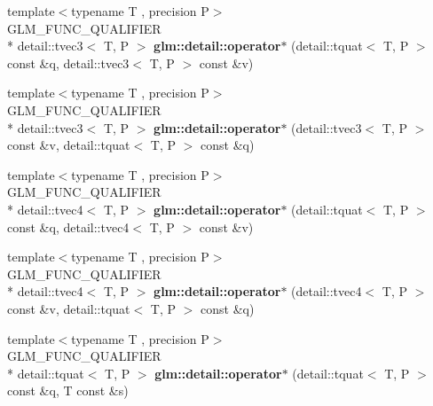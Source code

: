 \begin{DoxyCompactItemize}
\item 
\hypertarget{namespaceglm_1_1detail_a217e4015819bcaf1cc8f30c99698b102}{{\footnotesize template$<$typename T , precision P$>$ }\\G\-L\-M\-\_\-\-F\-U\-N\-C\-\_\-\-Q\-U\-A\-L\-I\-F\-I\-E\-R \\*
detail\-::tvec3$<$ T, P $>$ {\bfseries glm\-::detail\-::operator$\ast$} (detail\-::tquat$<$ T, P $>$ const \&q, detail\-::tvec3$<$ T, P $>$ const \&v)}\label{namespaceglm_1_1detail_a217e4015819bcaf1cc8f30c99698b102}

\item 
\hypertarget{namespaceglm_1_1detail_a1e3484b9cf1adf99d5cdefa17192960f}{{\footnotesize template$<$typename T , precision P$>$ }\\G\-L\-M\-\_\-\-F\-U\-N\-C\-\_\-\-Q\-U\-A\-L\-I\-F\-I\-E\-R \\*
detail\-::tvec3$<$ T, P $>$ {\bfseries glm\-::detail\-::operator$\ast$} (detail\-::tvec3$<$ T, P $>$ const \&v, detail\-::tquat$<$ T, P $>$ const \&q)}\label{namespaceglm_1_1detail_a1e3484b9cf1adf99d5cdefa17192960f}

\item 
\hypertarget{namespaceglm_1_1detail_afb46a99a6d108f6140e06681e2b3be04}{{\footnotesize template$<$typename T , precision P$>$ }\\G\-L\-M\-\_\-\-F\-U\-N\-C\-\_\-\-Q\-U\-A\-L\-I\-F\-I\-E\-R \\*
detail\-::tvec4$<$ T, P $>$ {\bfseries glm\-::detail\-::operator$\ast$} (detail\-::tquat$<$ T, P $>$ const \&q, detail\-::tvec4$<$ T, P $>$ const \&v)}\label{namespaceglm_1_1detail_afb46a99a6d108f6140e06681e2b3be04}

\item 
\hypertarget{namespaceglm_1_1detail_a55d4ec031a5b440d34d6f5cb475b621d}{{\footnotesize template$<$typename T , precision P$>$ }\\G\-L\-M\-\_\-\-F\-U\-N\-C\-\_\-\-Q\-U\-A\-L\-I\-F\-I\-E\-R \\*
detail\-::tvec4$<$ T, P $>$ {\bfseries glm\-::detail\-::operator$\ast$} (detail\-::tvec4$<$ T, P $>$ const \&v, detail\-::tquat$<$ T, P $>$ const \&q)}\label{namespaceglm_1_1detail_a55d4ec031a5b440d34d6f5cb475b621d}

\item 
\hypertarget{namespaceglm_1_1detail_ae7c9ae2e54227c51aa9f316e59504a64}{{\footnotesize template$<$typename T , precision P$>$ }\\G\-L\-M\-\_\-\-F\-U\-N\-C\-\_\-\-Q\-U\-A\-L\-I\-F\-I\-E\-R \\*
detail\-::tquat$<$ T, P $>$ {\bfseries glm\-::detail\-::operator$\ast$} (detail\-::tquat$<$ T, P $>$ const \&q, T const \&s)}\label{namespaceglm_1_1detail_ae7c9ae2e54227c51aa9f316e59504a64}


\end{DoxyCompactItemize}
